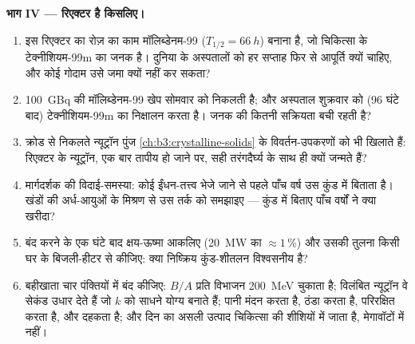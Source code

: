 \begin{problem}
\medskip\noindent\textbf{भाग IV --- रिएक्टर है किसलिए।}

\begin{enumerate}[resume]
  \item इस रिएक्टर का रोज़ का काम मॉलिब्डेनम-99
        ($T_{1/2} = \qty{66}{h}$) बनाना है, जो चिकित्सा के
        टेक्नीशियम-99m का जनक है। दुनिया के अस्पतालों को हर सप्ताह
        फिर से आपूर्ति क्यों चाहिए, और कोई गोदाम उसे जमा क्यों नहीं
        कर सकता?
  \item \qty{100}{GBq} की मॉलिब्डेनम-99 खेप सोमवार को निकलती है;
        और अस्पताल शुक्रवार को (96 घंटे बाद) टेक्नीशियम-99m का
        निक्षालन करता है। जनक की कितनी सक्रियता बची रहती है?
  \item क्रोड से निकलते न्यूट्रॉन पुंज
        \cref{ch:b3:crystalline-solids} के विवर्तन-उपकरणों को भी
        खिलाते हैं: रिएक्टर के न्यूट्रॉन, एक बार तापीय हो जाने पर,
        सही तरंगदैर्घ्य के साथ ही क्यों जन्मते हैं?
  \item मार्गदर्शक की विदाई-समस्या: कोई ईंधन-तत्त्व भेजे जाने से
        पहले पाँच वर्ष उस कुंड में बिताता है। खंडों की अर्ध-आयुओं के
        मिश्रण से उस तर्क को समझाइए --- कुंड में बिताए पाँच वर्षों
        ने क्या खरीदा?
  \item बंद करने के एक घंटे बाद क्षय-ऊष्मा आकलिए
        (\qty{20}{MW} का $\approx1\,\%$) और उसकी तुलना किसी घर के
        बिजली-हीटर से कीजिए: क्या निष्क्रिय कुंड-शीतलन विश्वसनीय है?
  \item बहीखाता चार पंक्तियों में बंद कीजिए: $B/A$ प्रति विभाजन
        \qty{200}{MeV} चुकाता है; विलंबित न्यूट्रॉन वे सेकंड उधार
        देते हैं जो $k$ को साधने योग्य बनाते हैं; पानी मंदन करता है,
        ठंडा करता है, परिरक्षित करता है, और दहकता है; और दिन का असली
        उत्पाद चिकित्सा की शीशियों में जाता है, मेगावॉटों में नहीं।
\end{enumerate}
\end{problem}
